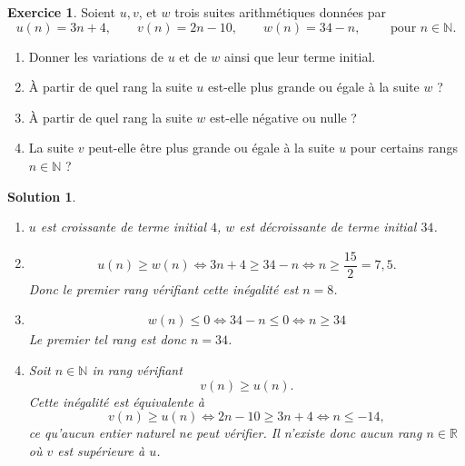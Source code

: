 \documentclass[12pt]{paper}
\theoremstyle{plain}
\newtheorem*{sol}{Solution}
\theoremstyle{definition}
\newtheorem{ex}{Exercice}
\newcommand{\R}{\mathbb{R}}
\newcommand{\N}{\mathbb{N}}
\newcommand{\exe}[2]{
		\begin{ex} #1  \end{ex}
		\begin{sol} #2 \end{sol}
	}
\newcommand{\exe}[2]{
		\begin{ex} #1  \end{ex}
	}
\begin{document}
\exe{
	Soient $u, v$, et $w$ trois suites arithmétiques données par
		\[ u(n ) = 3n + 4, \qquad v(n) = 2n -10, \qquad w(n) = 34 - n, \qquad \text{ pour } n \in \N.\]
	\begin{enumerate}
		\item Donner les variations de $u$ et de $w$ ainsi que leur terme initial.
		\item À partir de quel rang la suite $u$ est-elle plus grande ou égale à la suite $w$ ?
		\item À partir de quel rang la suite $w$ est-elle négative ou nulle ?
		\item La suite $v$ peut-elle être plus grande ou égale à la suite $u$ pour certains rangs $n\in\N$ ?
	\end{enumerate}
}{

	\begin{enumerate}
		\item $u$ est croissante de terme initial $4$, $w$ est décroissante de terme initial $34$.
		\item 
			\begin{align*}
			u(n) \geq w(n) \iff 3n + 4 \geq 34 - n \iff n \geq \dfrac{15}{2} = 7{,}5.
			\end{align*}
			Donc le premier rang vérifiant cette inégalité est $n=8$.
		\item 
			\begin{align*}
				w(n) \leq 0 \iff 34 -n \leq 0 \iff n \geq 34
			\end{align*}
		Le premier tel rang est donc $n=34$.
		\item Soit $n\in\N$ in rang vérifiant
			\[ v(n) \geq u(n). \]
		Cette inégalité est équivalente à
		 	\[ v(n) \geq u(n) \iff 2n -10 \geq 3n+4 \iff n \leq -14, \]
		 ce qu'aucun entier naturel ne peut vérifier. Il n'existe donc aucun rang $n\in\R$ où $v$ est supérieure à $u$.
	\end{enumerate}



}
\end{document}
